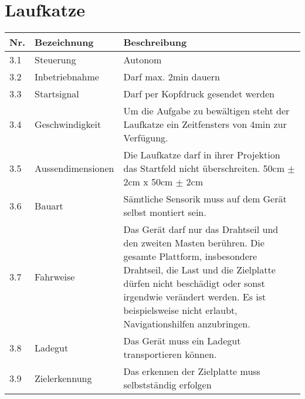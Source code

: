 \documentclass[a4paper]{report}
\begin{document}
\section{Laufkatze}
\begin{tabular}{|l|l|l|}
	\hline 
	\textbf{Nr.} & \textbf{Bezeichnung} & \textbf{Beschreibung} \\
	\hline 
	3.1 & Steuerung & Autonom \\
	\hline
	3.2 & Inbetriebnahme & Darf max. 2min dauern \\
	\hline
	3.3 & Startsignal & Darf per Kopfdruck gesendet werden \\
	\hline
	3.4 & Geschwindigkeit & Um die Aufgabe zu bewältigen steht der Laufkatze ein Zeitfensters von 4min zur Verfügung. \\
	\hline
	3.5 & Aussendimensionen & Die Laufkatze darf in ihrer Projektion das Startfeld nicht überschreiten. 50cm $\pm$ 2cm x 50cm $\pm$ 2cm \\
	\hline
	3.6 & Bauart & Sämtliche Sensorik muss auf dem Gerät selbst montiert sein. \\
	\hline
	3.7 & Fahrweise & Das Gerät darf nur das Drahtseil und den zweiten Masten berühren. Die gesamte Plattform, insbesondere Drahtseil, die Last und die Zielplatte dürfen nicht beschädigt oder sonst irgendwie verändert werden. Es ist beispielsweise nicht erlaubt, Navigationshilfen anzubringen. \\
	\hline
	3.8 & Ladegut & Das Gerät muss ein Ladegut transportieren können. \\
	\hline
	3.9 & Zielerkennung & Das erkennen der Zielplatte muss selbstständig erfolgen\\
	\hline 
\end{tabular}
\end{document}
